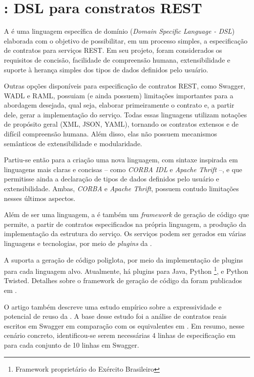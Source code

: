 \section{\neoidl{}: DSL para constratos REST}
 

A \neoidl{} é uma linguagem específica de domínio (\textit{Domain Specific
Language - DSL}) elaborada com o objetivo de possibilitar, em um processo
simples, a especificação de contratos para serviços REST. Em seu projeto, 
foram considerados os requisitos de concisão, facilidade de compreensão humana,
extensibilidade e suporte à herança simples dos tipos de dados definidos pelo
usuário.

Outras opções disponíveis para
especificação de contratos REST, como Swagger\cite{swaggerSite}, WADL\cite{hadley2006web} e
RAML\cite{RAML}, possuiam (e ainda possuem) limitações importantes para a
abordagem desejada, qual seja, elaborar primeiramente o contrato e, a
partir dele, gerar a implementação do serviço. Todas essas linguagens utilizam
notações de propósito geral (XML\cite{XML}, JSON\cite{JSon}, YAML\cite{YAML}),
tornando os contratos extensos e de difícil compreensão humana. Além disso,
elas não possuem mecanismos semânticos de extensibilidade e modularidade.

Partiu-se então para a criação uma nova linguagem, com sintaxe
inspirada em linguagens mais claras e concisas -- como \emph{CORBA
IDL}\texttrademark \cite{corba} e \emph{Apache
Thrift}\texttrademark\cite{thrift} --, e que permitisse ainda a declaração de
tipos de dados definidos pelo usuário e extensibilidade. Ambas, \emph{CORBA} e
\emph{Apache Thrift}, possuem contudo limitações nesses últimos aspectos. 

Além de ser uma linguagem, a \neoidl{} é também um \textit{framework} de geração
de código que permite, a partir de contratos especificados na própria
linguagem, a produção da implementação da estrutura do serviço. Os serviços
podem ser gerados em várias linguagens e tecnologias, por meio
de \textit{plugins} da \neoidl{}.

A \neoidl{} suporta a geração de código poliglota, por meio da implementação de
plugins \neoidl{} para cada linguagem alvo. Atualmente, há plugins para Java,
Python \neocortex{}\footnote{Framework proprietário do Exército Brasileiro},
e Python Twisted. Detalhes sobre o
framework de geração de código da \neoidl{} foram publicados em
\cite{lima2015neoidl}. 

O artigo \cite{lima2015neoidl} também descreve uma estudo empírico sobre a
expressividade e potencial de reuso da \neoidl{}. A base desse estudo foi a
análise de contratos reais escritos em Swagger em comparação com os equivalentes
em \neoidl{}. Em resumo, nesse cenário concreto, identificou-se serem
necessárias 4 linhas de especificação em \neoidl{} para cada conjunto de 10
linhas em Swagger.

